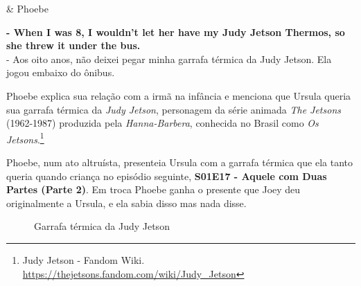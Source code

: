 \begin{tcolorbox}[enhanced,center upper,
    drop fuzzy shadow southeast, boxrule=0.3pt,
    lower separated=false, breakable,
    colframe=black!30!dialogoBorder,colback=white]
\begin{minipage}[c]{0.16\linewidth}
   & \centering \scriptsize{Phoebe}
\end{minipage}
\hfill
\begin{minipage}[c]{0.8\linewidth}
  \textbf{- When I was 8, I wouldn't let her have my Judy Jetson Thermos, so she threw it under the bus.}\\
  - Aos oito anos, não deixei pegar minha garrafa térmica da Judy Jetson. Ela jogou embaixo do ônibus.
\end{minipage}
\end{tcolorbox}

Phoebe explica sua relação com a irmã na infância e menciona que Ursula
queria sua garrafa térmica da \emph{Judy Jetson}, personagem da série
animada \emph{The Jetsons} (1962-1987) produzida pela
\emph{Hanna-Barbera}, conhecida no Brasil como \emph{Os
Jetsons}.\footnote{\sloppy Judy Jetson - Fandom Wiki. \url{https://thejetsons.fandom.com/wiki/Judy_Jetson}}

Phoebe, num ato altruísta, presenteia Ursula com a garrafa térmica que
ela tanto queria quando criança no episódio seguinte,
\textbf{\textcolor{primarycolor}{S01E17 - Aquele com Duas Partes (Parte 2)}}.
Em troca Phoebe ganha o presente que Joey deu originalmente a Ursula, e
ela sabia disso mas nada disse.

\begin{figure}
  \centering
    \caption{Garrafa térmica da Judy Jetson\label{fig:garrafa-t-rmica-da-judy-jetson}}
\end{figure}
